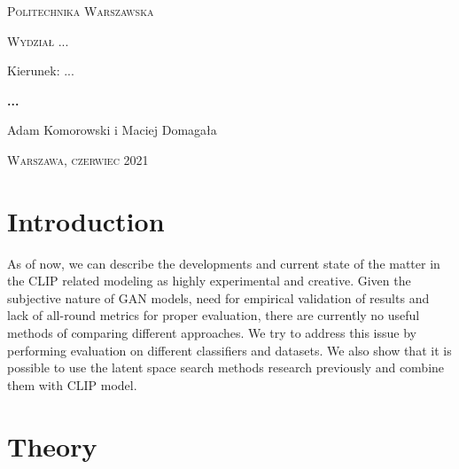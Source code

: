 \documentclass[12pt,a4paper,openany]{book}
\begin{document}
\begin{titlepage}
\begin{flushleft}
\end{flushleft}
\begin{center}
\textsc{{\huge Politechnika Warszawska}}
\end{center}
\bigskip
\bigskip
\begin{center}
\textsc{{\Large Wydział ...}}
\end{center}
\bigskip
\bigskip
\begin{center}
\begin{Large}
Kierunek: ...
\end{Large}
\end{center}
\bigskip
\bigskip
\noindent\hrulefill
\begin{center}
\textsc{\textbf{{\large ...
\\}}}
\bigskip
\bigskip

{\large 
Adam Komorowski i Maciej Domagała}

\end{center}
\noindent\hrulefill
\bigskip
\bigskip
\begin{center}
\end{center}
\bigskip
\bigskip
\bigskip
\bigskip
\begin{center}
{\textsc{\large Warszawa, czerwiec 2021
}}
\end{center}
\end{titlepage}

\tableofcontents

\chapter*{Introduction}

\noindent As of now, we can describe the developments and current state of the matter in the CLIP related modeling as highly experimental and creative. Given the subjective nature of GAN models, need for empirical validation of results and lack of all-round metrics for proper evaluation, there are currently no useful methods of comparing different approaches. We try to address this issue by performing evaluation on different classifiers and datasets. We also show that it is possible to use the latent space search methods research previously and combine them with CLIP model. 

\chapter{Theory}
\end{document}
